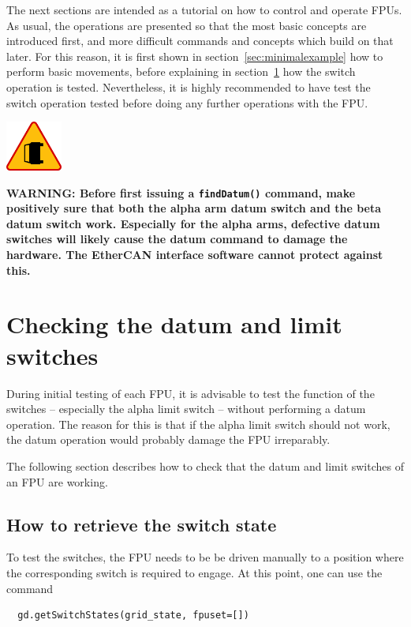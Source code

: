 \documentclass[fontsize=12,a4paper]{scrreprt}
\newenvironment{warning}{\begin{framed}\includegraphics[width=5em]{accident-area-ahead.png}
}{\end{framed}}
\begin{document}
The next sections are intended as a tutorial on how to control and
operate FPUs. As usual, the operations are presented so that the most
basic concepts are introduced first, and more difficult commands and
concepts which build on that later. For this reason, it is first shown
in section~\ref{sec:minimalexample} how to perform basic movements,
before explaining in section~\ref{sec:datumswitchcheck} how the switch
operation is tested. Nevertheless, it is highly recommended to have
test the switch operation tested before doing any further operations
with the FPU.

\begin{warning}
  \textbf{WARNING: Before first issuing a \texttt{findDatum()}
    command, make positively sure that both the alpha arm datum switch
    and the beta datum switch work. Especially for the alpha arms,
    defective datum switches will likely cause the datum command to
    damage the hardware. The EtherCAN interface software cannot protect against
    this.}
\end{warning}



\chapter{Checking the datum and limit switches}
\label{sec:datumswitchcheck}

During initial testing of each FPU, it is advisable to test the
function of the switches -- especially the alpha limit switch --
without performing a datum operation. The reason for this is that if
the alpha limit switch should not work, the datum operation would
probably damage the FPU irreparably.

The following section describes how to check that the datum and limit
switches of an FPU are working.

\section{How to retrieve the switch state}


To test the switches, the FPU needs to be be driven manually to a
position where the corresponding switch is required to engage. At this
point, one can use the command

\begin{verbatim}
  gd.getSwitchStates(grid_state, fpuset=[])
\end{verbatim}
\end{document}
